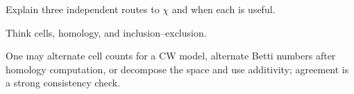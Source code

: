 \begin{exercise}\label{exr:viii21-ped-16}
Explain three independent routes to $\chi$ and when each is useful.
\end{exercise}
\begin{hint}
Think cells, homology, and inclusion--exclusion.
\end{hint}
\begin{solution}
One may alternate cell counts for a CW model, alternate Betti numbers after homology computation, or decompose the space and use additivity; agreement is a strong consistency check.
\end{solution}


